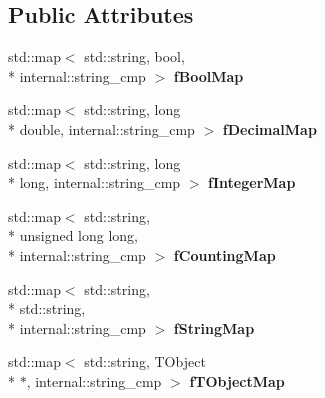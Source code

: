 \subsection*{Public Attributes}
\begin{DoxyCompactItemize}
\item 
\hypertarget{class_h_a_l_1_1_analysis_data_adc7232f1a112de23d2b557740422ec9f}{std\+::map$<$ std\+::string, bool, \\*
internal\+::string\+\_\+cmp $>$ {\bfseries f\+Bool\+Map}}\label{class_h_a_l_1_1_analysis_data_adc7232f1a112de23d2b557740422ec9f}

\item 
\hypertarget{class_h_a_l_1_1_analysis_data_a79170e31902d40d73d6838b816e74dc8}{std\+::map$<$ std\+::string, long \\*
double, internal\+::string\+\_\+cmp $>$ {\bfseries f\+Decimal\+Map}}\label{class_h_a_l_1_1_analysis_data_a79170e31902d40d73d6838b816e74dc8}

\item 
\hypertarget{class_h_a_l_1_1_analysis_data_a5487671b851b8ce89298d7f770ab8f34}{std\+::map$<$ std\+::string, long \\*
long, internal\+::string\+\_\+cmp $>$ {\bfseries f\+Integer\+Map}}\label{class_h_a_l_1_1_analysis_data_a5487671b851b8ce89298d7f770ab8f34}

\item 
\hypertarget{class_h_a_l_1_1_analysis_data_a6f29542f7f2cd7e7377c56ac54592dd5}{std\+::map$<$ std\+::string, \\*
unsigned long long, \\*
internal\+::string\+\_\+cmp $>$ {\bfseries f\+Counting\+Map}}\label{class_h_a_l_1_1_analysis_data_a6f29542f7f2cd7e7377c56ac54592dd5}

\item 
\hypertarget{class_h_a_l_1_1_analysis_data_a3256b3efc77655ba25cc34a6986c00d5}{std\+::map$<$ std\+::string, \\*
std\+::string, \\*
internal\+::string\+\_\+cmp $>$ {\bfseries f\+String\+Map}}\label{class_h_a_l_1_1_analysis_data_a3256b3efc77655ba25cc34a6986c00d5}

\item 
\hypertarget{class_h_a_l_1_1_analysis_data_a913d66198c57cc2bd9f0e3e5d904e33f}{std\+::map$<$ std\+::string, T\+Object \\*
$\ast$, internal\+::string\+\_\+cmp $>$ {\bfseries f\+T\+Object\+Map}}\label{class_h_a_l_1_1_analysis_data_a913d66198c57cc2bd9f0e3e5d904e33f}


\end{DoxyCompactItemize}
